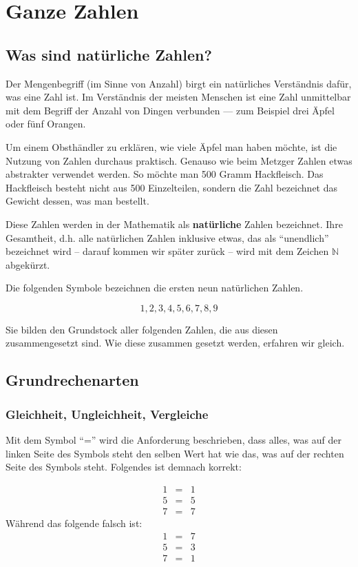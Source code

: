 
\chapter{Ganze Zahlen}

\section{Was sind natürliche Zahlen?}

Der Mengenbegriff (im Sinne von Anzahl) birgt ein natürliches Verständnis dafür, was eine Zahl ist. Im Verständnis der meisten Menschen ist eine Zahl unmittelbar mit dem Begriff der Anzahl von Dingen verbunden --- zum Beispiel drei Äpfel oder fünf Orangen.

Um einem Obsthändler zu erklären, wie viele Äpfel man haben möchte, ist die Nutzung von Zahlen durchaus praktisch. Genauso wie beim Metzger Zahlen etwas abstrakter verwendet werden. So möchte man 500 Gramm Hackfleisch. Das Hackfleisch besteht nicht aus 500 Einzelteilen, sondern die Zahl bezeichnet das Gewicht dessen, was man bestellt.

Diese Zahlen werden in der Mathematik als \textbf{natürliche} Zahlen bezeichnet. Ihre Gesamtheit, d.h. alle natürlichen Zahlen inklusive etwas, das als "`unendlich"' bezeichnet wird -- darauf kommen wir später zurück -- wird mit dem Zeichen $\mathbb{N}$ abgekürzt.

Die folgenden Symbole bezeichnen die ersten neun natürlichen Zahlen. 

\[ 
1, 2, 3, 4, 5, 6, 7, 8, 9
\]

Sie bilden den Grundstock aller folgenden Zahlen, die aus diesen zusammengesetzt sind. Wie diese zusammen gesetzt werden, erfahren wir gleich.

\section{Grundrechenarten}

\subsection{Gleichheit, Ungleichheit, Vergleiche}

Mit dem Symbol "`="' wird die Anforderung beschrieben, dass alles, was auf der linken Seite des Symbols steht den selben Wert hat wie das, was auf der rechten Seite des Symbols steht. Folgendes ist demnach korrekt:

\begin{eqnarray*}
1 &=& 1 \\
5 &=& 5 \\
7 &=& 7
\end{eqnarray*}
Während das folgende falsch ist:
\begin{eqnarray*}
1 &=& 7 \\
5 &=& 3 \\
7 &=& 1
\end{eqnarray*}

